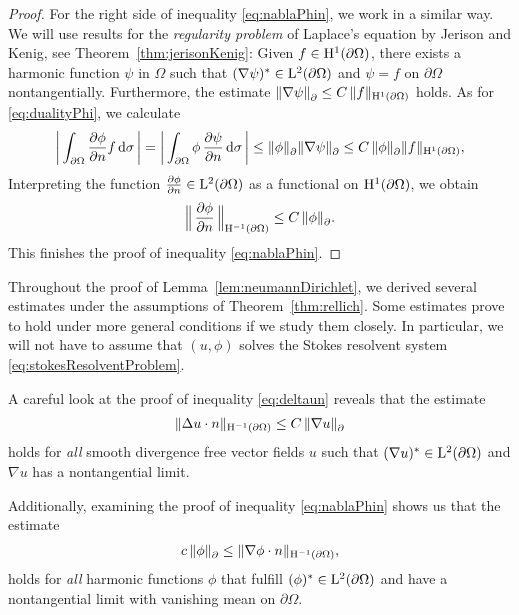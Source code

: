 \begin{proof}
  For the right side of inequality \eqref{eq:nablaPhin}, we work in a similar way.
  We will use results for the \emph{regularity problem} of Laplace's equation by Jerison and Kenig, see Theorem~\ref{thm:jerisonKenig}:
  Given $f \in \mathrm{H}^1(\partial\Omega)$, there exists a harmonic function $\psi$ in $\Omega$ such that $(\nabla\psi)^* \in \mathrm{L}^2(\partial\Omega)$ and $\psi = f$ on $\partial\Omega$ nontangentially. Furthermore, the estimate $\|\nabla \psi\|^{}_\partial \leq C\, \|f\|_{\mathrm{H}^1(\partial\Omega)}$ holds.
  As for \eqref{eq:dualityPhi}, we calculate
  \begin{align*}
    \bigg| \int_{\partial\Omega} \frac{\partial\phi}{\partial n} f \, {\operatorname{d}\!{\sigma}}\, \bigg|
    = \bigg| \int_{\partial\Omega} \phi\, \frac{\partial \psi}{\partial n} \, {\operatorname{d}\!{\sigma}}\, \bigg| 
    \leq \|\phi\|^{}_{\partial} \|\nabla \psi \|^{}_\partial 
    \leq C\, \|\phi\|^{}_\partial \|f\|_{\mathrm{H}^1(\partial\Omega)},
  \end{align*}
  Interpreting the function $\frac{\partial\phi}{\partial n} \in \mathrm{L}^2(\partial\Omega)$ as a functional on $\mathrm{H}^1(\partial\Omega)$, we obtain
  \begin{align*}
      \Big\|\,\frac{\partial\phi}{\partial n}\, \Big\|_{\mathrm{H}^{-1}(\partial\Omega)} \leq C\, \|\phi\|^{}_\partial. 
  \end{align*}
  This finishes the proof of inequality \eqref{eq:nablaPhin}.
\end{proof}

\begin{rem}
  \label{rem:harmonicEstimate}
  Throughout the proof of Lemma~\ref{lem:neumannDirichlet}, we derived several estimates under the assumptions of Theorem~\ref{thm:rellich}. 
  Some estimates prove to hold under more general conditions if we study them closely.
  In particular, we will not have to assume that $(u,\phi)$ solves the Stokes resolvent system \eqref{eq:stokesResolventProblem}.

  A careful look at the proof of inequality \eqref{eq:deltaun} reveals that the estimate
  \begin{align*}
    \|\Delta u \cdot n\|_{\mathrm{H}^{-1}(\partial\Omega)}
    \leq C\, \|\nabla u\|^{}_\partial
  \end{align*}
  holds for \emph{all} smooth divergence free vector fields $u$ such that $(\nabla u)^* \in \mathrm{L}^2(\partial\Omega)$ and $\nabla u$ has a nontangential limit. 

  Additionally, examining the proof of inequality \eqref{eq:nablaPhin} shows us that the estimate
  \begin{align*}
      c\, \| \phi \|^{}_\partial \leq \| \nabla \phi \cdot n \|_{\mathrm{H}^{-1}(\partial\Omega)},
  \end{align*}
  holds for \emph{all} harmonic functions $\phi$ that fulfill $(\phi)^* \in\mathrm{L}^2(\partial\Omega)$ and have a nontangential limit with vanishing mean on $\partial\Omega$.
\end{rem}

